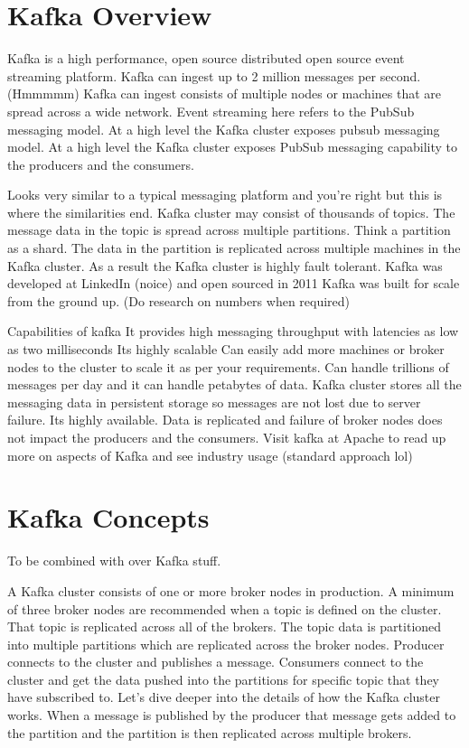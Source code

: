 \documentclass[a4paper, 11pt]{book}
\begin{document}
    \section{Kafka Overview}

    Kafka is a high performance, open source distributed open source event streaming platform.
    Kafka can ingest up to 2 million messages per second. (Hmmmmm)
    Kafka can ingest consists of multiple nodes or machines that are spread across a wide network.
    Event streaming here refers to the PubSub messaging model.
    At a high level the Kafka cluster exposes pubsub messaging model.
    At a high level the Kafka cluster exposes PubSub messaging capability to the producers and the consumers.

    Looks very similar to a typical messaging platform and you're right but this is where the similarities end.
    Kafka cluster may consist of thousands of topics.
    The message data in the topic is spread across multiple partitions.
    Think a partition as a shard.
    The data in the partition is replicated across multiple machines in the Kafka cluster.
    As a result the Kafka cluster is highly fault tolerant.
    Kafka was developed at LinkedIn (noice) and open sourced in 2011
    Kafka was built for scale from the ground up. (Do research on numbers when required)

    Capabilities of kafka
    It provides high messaging throughput with latencies as low as two milliseconds
    Its highly scalable
    Can easily add more machines or broker nodes to the cluster to scale it as per your requirements.
    Can handle trillions of messages per day and it can handle petabytes of data.
    Kafka cluster stores all the messaging data in persistent storage so messages are not lost due to server failure.
    Its highly available.
    Data is replicated and failure of broker nodes does not impact the producers and the consumers.
    Visit kafka at Apache to read up more on aspects of Kafka and see industry usage (standard approach lol)


    \section{Kafka Concepts}
    To be combined with over Kafka stuff.

    A Kafka cluster consists of one or more broker nodes in production.
    A minimum of three broker nodes are recommended when a topic is defined on the cluster.
    That topic is replicated across all of the brokers.
    The topic data is partitioned into multiple partitions which are replicated across the broker nodes.
    Producer connects to the cluster and publishes a message.
    Consumers connect to the cluster and get the data pushed into the partitions for specific topic that they have subscribed to.
    Let's dive deeper into the details of how the Kafka cluster works.
    When a message is published by the producer that message gets added to the partition and the partition is then replicated across multiple brokers.
\end{document}
